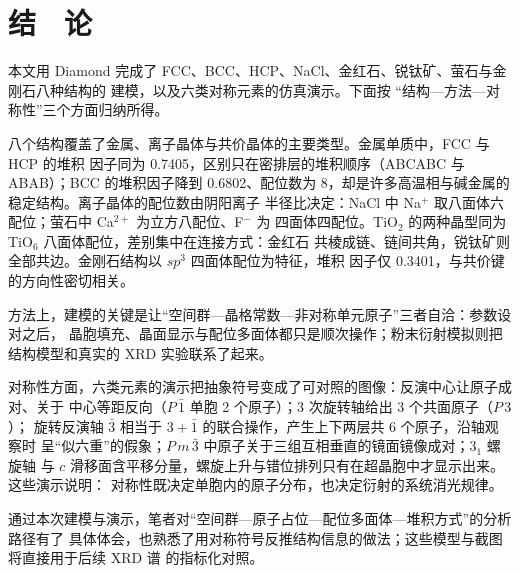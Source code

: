 \setcounter{section}{6}
\section{结　论}

本文用 Diamond 完成了 FCC、BCC、HCP、NaCl、金红石、锐钛矿、萤石与金刚石八种结构的
建模，以及六类对称元素的仿真演示。下面按
``结构—方法—对称性''三个方面归纳所得。

八个结构覆盖了金属、离子晶体与共价晶体的主要类型。金属单质中，FCC 与 HCP 的堆积
因子同为 0.7405，区别只在密排层的堆积顺序（ABCABC 与 ABAB）；BCC 的堆积因子降到
0.6802、配位数为 8，却是许多高温相与碱金属的稳定结构。离子晶体的配位数由阴阳离子
半径比决定：NaCl 中 Na$^+$ 取八面体六配位；萤石中 Ca$^{2+}$ 为立方八配位、F$^-$ 为
四面体四配位。TiO$_2$ 的两种晶型同为 TiO$_6$ 八面体配位，差别集中在连接方式：金红石
共棱成链、链间共角，锐钛矿则全部共边。金刚石结构以 $sp^3$ 四面体配位为特征，堆积
因子仅 0.3401，与共价键的方向性密切相关。

方法上，建模的关键是让``空间群—晶格常数—非对称单元原子''三者自洽：参数设对之后，
晶胞填充、晶面显示与配位多面体都只是顺次操作；粉末衍射模拟则把结构模型和真实的
XRD 实验联系了起来。

对称性方面，六类元素的演示把抽象符号变成了可对照的图像：反演中心让原子成对、关于
中心等距反向（$P\,\bar1$ 单胞 2 个原子）；3 次旋转轴给出 3 个共面原子（$P\,3$）；
旋转反演轴 $\bar3$ 相当于 $3+\bar1$ 的联合操作，产生上下两层共 6 个原子，沿轴观察时
呈``似六重''的假象；$P\,m\,\bar3$ 中原子关于三组互相垂直的镜面镜像成对；$3_1$ 螺旋轴
与 $c$ 滑移面含平移分量，螺旋上升与错位排列只有在超晶胞中才显示出来。这些演示说明：
对称性既决定单胞内的原子分布，也决定衍射的系统消光规律。

通过本次建模与演示，笔者对``空间群—原子占位—配位多面体—堆积方式''的分析路径有了
具体体会，也熟悉了用对称符号反推结构信息的做法；这些模型与截图将直接用于后续 XRD 谱
的指标化对照。
